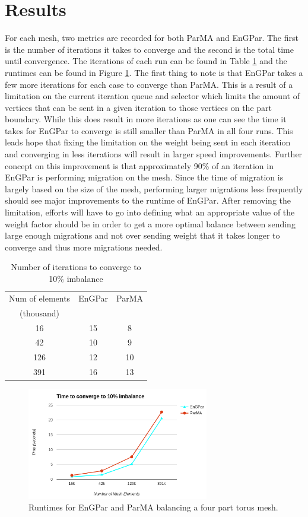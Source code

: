 \documentclass[a4paper]{article}
\begin{document}
\section{Results}
For each mesh, two metrics are recorded for both ParMA and EnGPar. The first is the number of iterations it takes to converge and the second is the total time until convergence. The iterations of each run can be found in Table \ref{tbl:iterations} and the runtimes can be found in Figure \ref{fig:runtime}. The first thing to note is that EnGPar takes a few more iterations for each case to converge than ParMA. This is a result of a limitation on the current iteration queue and selector which limits the amount of vertices that can be sent in a given iteration to those vertices on the part boundary. While this does result in more iterations as one can see the time it takes for EnGPar to converge is still smaller than ParMA in all four runs. This leads hope that fixing the limitation on the weight being sent in each iteration and converging in less iterations will result in larger speed improvements. Further concept on this improvement is that approximately 90\% of an iteration in EnGPar is performing migration on the mesh. Since the time of migration is largely based on the size of the mesh, performing larger migrations less frequently should see major improvements to the runtime of EnGPar. After removing the limitation, efforts will have to go into defining what an appropriate value of the weight factor should be in order to get a more optimal balance between sending large enough migrations and not over sending weight that it takes longer to converge and thus more migrations needed.

\begin{table}
  \centering
  \begin{tabular}{|c|c|c|}
    \hline
    Num of elements & EnGPar & ParMA \\
    (thousand) & & \\
    \hline
    16 & 15 & 8 \\
    42 & 10 & 9 \\
    126 & 12 & 10 \\
    391 & 16 & 13 \\
    \hline
  \end{tabular}
  \caption{Number of iterations to converge to 10\% imbalance}
  \label{tbl:iterations}
\end{table}

\begin{figure}[!ht]
  \centering
  \includegraphics[width=300px]{timeTorus.png}
  \caption{Runtimes for EnGPar and ParMA balancing a four part torus mesh.}
  \label{fig:runtime}
\end{figure}
\end{document}
